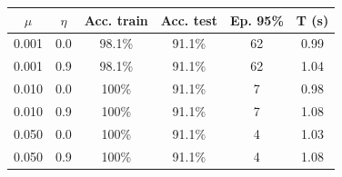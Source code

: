 \begin{tabular}{@{}cccccc@{}}
\toprule
$\mu$ & $\eta$ & Acc. train & Acc. test & Ep. 95\% & T (s) \\
\midrule
0.001 & 0.0 & 98.1\% & 91.1\% & 62 & 0.99 \\
0.001 & 0.9 & 98.1\% & 91.1\% & 62 & 1.04 \\
0.010 & 0.0 & 100\% & 91.1\% & 7 & 0.98 \\
0.010 & 0.9 & 100\% & 91.1\% & 7 & 1.08 \\
0.050 & 0.0 & 100\% & 91.1\% & 4 & 1.03 \\
0.050 & 0.9 & 100\% & 91.1\% & 4 & 1.08 \\
\bottomrule
\end{tabular}
